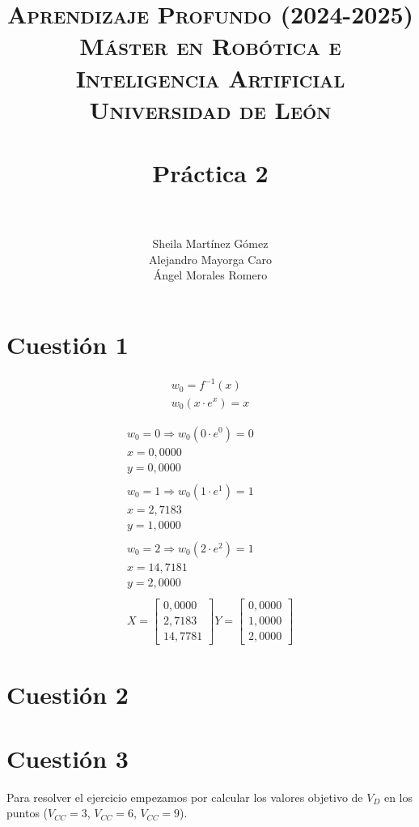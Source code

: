 \documentclass[paper=a4, fontsize=11pt]{scrartcl} %
\title{	
\normalfont \normalsize 
\textsc{{\textbf{Aprendizaje Profundo (2024-2025)}} \\ Máster en Robótica e Inteligencia Artificial \\ Universidad de León} \\ [20pt] %
\horrule{0.5pt} \\[0.4cm] %
\huge Práctica 2 \\   %
\horrule{1.5pt} \\[0.2cm] %
}
\author{Sheila Martínez Gómez\\
Alejandro Mayorga Caro\\
Ángel Morales Romero\\
}
\numberwithin{equation}{section} %
\numberwithin{figure}{section} %
\numberwithin{table}{section} %
\begin{document}
\maketitle
\newpage %


\section{Cuestión 1} 
\begin{gather*}
    w_0 = f^{-1}(x)\\
    w_0(x \cdot e^{x}) = x
\end{gather*}

\begin{gather*}
    w_0 = 0 \Rightarrow w_0(0 \cdot e^{0}) = 0\\ x=0,0000\\    y= 0,0000\\\\
    w_0 = 1 \Rightarrow w_0(1 \cdot e^{1}) = 1\\x=2,7183\\    y= 1,0000\\\\
    w_0 = 2 \Rightarrow w_0(2 \cdot e^{2}) = 1\\ x=14,7181\\    y= 2,0000\\\\  
X= \begin{bmatrix}
0,0000 \\
2,7183 \\
14,7781
\end{bmatrix}
Y= \begin{bmatrix}
0,0000 \\
1,0000 \\
2,0000
\end{bmatrix}
\end{gather*}

\section{Cuestión 2}
\section{Cuestión 3}

Para resolver el ejercicio empezamos por calcular los valores objetivo de $V_D$ en los puntos ($V_{CC} = 3$, $V_{CC} = 6$, $V_{CC} = 9$).
\end{document}
